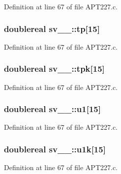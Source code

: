 Definition at line 67 of file A\+P\+T227.\+c.

\subsubsection[{\texorpdfstring{tp}{tp}}]{\setlength{\rightskip}{0pt plus 5cm}doublereal sv\+\_\+\_\+\+::tp\mbox{[}15\mbox{]}}\hypertarget{structsv__1___a0b5b1d84abcccb025565a0615b2a5cbd}{}\label{structsv__1___a0b5b1d84abcccb025565a0615b2a5cbd}


Definition at line 67 of file A\+P\+T227.\+c.

\subsubsection[{\texorpdfstring{tpk}{tpk}}]{\setlength{\rightskip}{0pt plus 5cm}doublereal sv\+\_\+\_\+\+::tpk\mbox{[}15\mbox{]}}\hypertarget{structsv__1___a8ce4f83fb875b705aae48b761b9e5b29}{}\label{structsv__1___a8ce4f83fb875b705aae48b761b9e5b29}


Definition at line 67 of file A\+P\+T227.\+c.

\subsubsection[{\texorpdfstring{u1}{u1}}]{\setlength{\rightskip}{0pt plus 5cm}doublereal sv\+\_\+\_\+\+::u1\mbox{[}15\mbox{]}}\hypertarget{structsv__1___a96ce900575fd0228b229e8955c1e3525}{}\label{structsv__1___a96ce900575fd0228b229e8955c1e3525}


Definition at line 67 of file A\+P\+T227.\+c.

\subsubsection[{\texorpdfstring{u1k}{u1k}}]{\setlength{\rightskip}{0pt plus 5cm}doublereal sv\+\_\+\_\+\+::u1k\mbox{[}15\mbox{]}}\hypertarget{structsv__1___a57e30544c223d12e24e659e3e8078068}{}\label{structsv__1___a57e30544c223d12e24e659e3e8078068}


Definition at line 67 of file A\+P\+T227.\+c.


